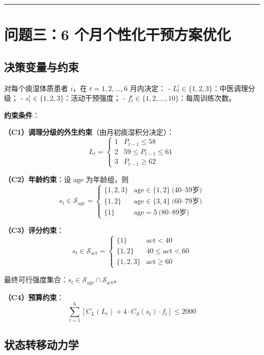 \documentclass{MathorCupmodeling}
\begin{document}
\begin{center}\rule{0.5\linewidth}{0.5pt}\end{center}

\section{问题三：6 个月个性化干预方案优化}\label{ux4e94ux95eeux9898ux4e096-ux4e2aux6708ux4e2aux6027ux5316ux5e72ux9884ux65b9ux6848ux4f18ux5316}

\subsection{决策变量与约束}\label{ux51b3ux7b56ux53d8ux91cfux4e0eux7ea6ux675f}

对每个痰湿体质患者 \(i\)，在 \(t = 1, 2, \dots, 6\) 月内决定： - \(L_t^i \in \{1, 2, 3\}\)：中医调理分级； - \(s_t^i \in \{1, 2, 3\}\)：活动干预强度； - \(f_t^i \in \{1, 2, \dots, 10\}\)：每周训练次数。

\textbf{约束条件}：

\textbf{（C1）调理分级的外生约束}（由月初痰湿积分决定）： \[L_t = \begin{cases}1 & P_{t-1} \le 58 \\ 2 & 59 \le P_{t-1} \le 61 \\ 3 & P_{t-1} \ge 62\end{cases}\]

\textbf{（C2）年龄约束}：设 \(\text{age}\) 为年龄组，则 \[s_t \in \mathcal{S}_{\text{age}} = \begin{cases}\{1,2,3\} & \text{age} \in \{1,2\}\ \text{(40--59岁)}\\ \{1,2\} & \text{age} \in \{3,4\}\ \text{(60--79岁)}\\ \{1\} & \text{age} = 5\ \text{(80--89岁)}\end{cases}\]

\textbf{（C3）评分约束}： \[s_t \in \mathcal{S}_{\text{act}} = \begin{cases}\{1\} & \text{act} < 40 \\ \{1, 2\} & 40 \le \text{act} < 60 \\ \{1, 2, 3\} & \text{act} \ge 60\end{cases}\]

最终可行强度集合：\(s_t \in \mathcal{S}_{\text{age}} \cap \mathcal{S}_{\text{act}}\)。

\textbf{（C4）预算约束}： \[\sum_{t=1}^{6} [C_L(L_t) + 4 \cdot C_S(s_t) \cdot f_t] \le 2000\]

\subsection{状态转移动力学}\label{ux72b6ux6001ux8f6cux79fbux52a8ux529bux5b66}
\end{document}

